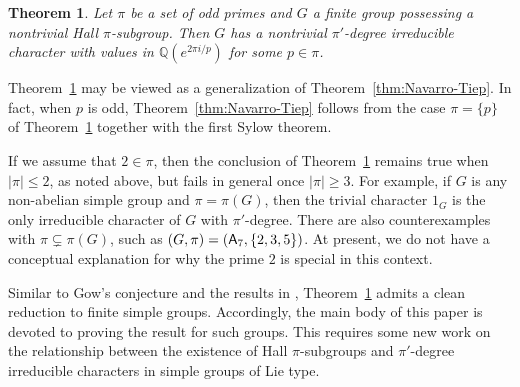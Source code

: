 \documentclass[12pt]{amsart}
\newtheorem{theorema}{Theorem}
\theoremstyle{definition}
\numberwithin{equation}{section}
\newcommand{\QQ}{{\mathbb Q}}
\newcommand{\Al}{\textup{\textsf{A}}}
\begin{document}
\begin{theorema}\label{thm:main}
Let $\pi$ be a set of odd primes and $G$ a finite group possessing a
nontrivial Hall $\pi$-subgroup. Then $G$ has a nontrivial
$\pi'$-degree irreducible character with values in $\QQ(e^{2\pi
i/p})$ for some $p\in\pi$.
\end{theorema}



Theorem~\ref{thm:main} may be viewed as a generalization of
Theorem~\ref{thm:Navarro-Tiep}. In fact, when $p$ is odd,
Theorem~\ref{thm:Navarro-Tiep} follows from the case $\pi=\{p\}$ of
Theorem~\ref{thm:main} together with the first Sylow theorem.

If we assume that $2\in \pi$, then the conclusion of
Theorem~\ref{thm:main} remains true when %
$|\pi|\leq 2$, as %
noted
above, but fails in general once $|\pi|\geq 3$. For example, if $G$
is any non-abelian simple group and %
$\pi=\pi(G)$, then %
the trivial
character $1_G$ is the only irreducible character of $G$ with
$\pi'$-degree. There are also counterexamples with $\pi\varsubsetneq
\pi(G)$, such as $(G,\pi)=(\Al_7,\{2,3,5\})$. At present, we do not
have a conceptual explanation for why the prime $2$ is special in
this context.

Similar to Gow's conjecture and the results in
\cite{Navarro-Tiep1,GHSV21}, Theorem~\ref{thm:main} admits a clean
reduction to finite simple groups. Accordingly, the main body of
this paper is devoted to proving the result for such groups. This
requires some new work on the relationship between the existence of
Hall $\pi$-subgroups and $\pi'$-degree irreducible characters in
simple groups of Lie type.
\end{document}
